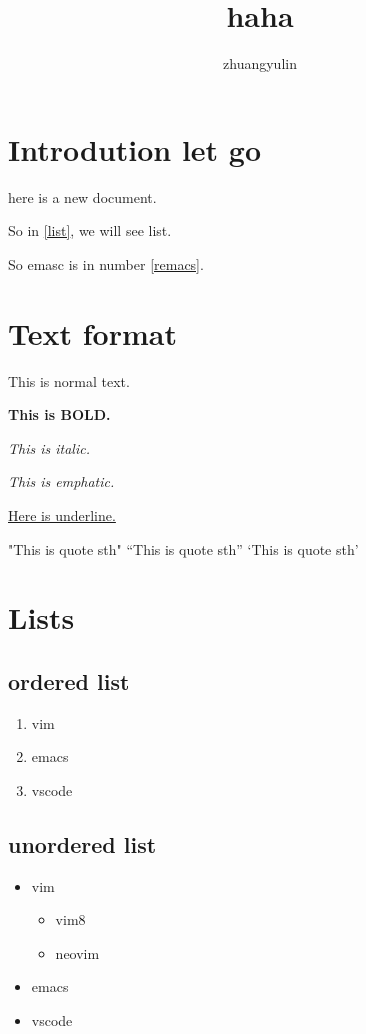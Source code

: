 \documentclass{article}
\author{zhuangyulin}
\title{haha}
\begin{document}
\maketitle

\section{Introdution let go}

here is a new document.

So in \ref{list}, we will see list.

So emasc is in number \ref{remacs}.

\section{Text format}
This is normal text. 

\textbf{This is BOLD.}

\textit{This is italic.}

\emph{This is emphatic.}

\underline{Here is underline.}

"This is quote sth"
``This is quote sth''
`This is quote sth'

\section{Lists\label{list}}
\subsection{ordered list}
\begin{enumerate}
    \item vim
    \item emacs \label{remacs}
    \item vscode
\end{enumerate}

\subsection{unordered list}
\begin{itemize}
    \item vim
        \begin{itemize}
            \item vim8
            \item neovim
        \end{itemize}
    \item emacs
    \item vscode
\end{itemize}
\end{document}

